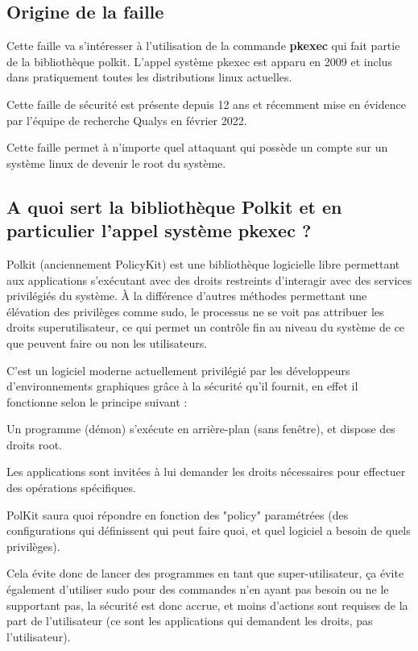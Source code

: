 \documentclass[12pt,a4paper]{article}
\begin{document}
		\subsection{Origine de la faille}   
   		\begin{flushleft}
   			\noindent Cette faille va s'intéresser à l'utilisation de la commande \textbf{pkexec} qui fait partie de la bibliothèque polkit. L'appel système pkexec est apparu en 2009 et inclus dans pratiquement toutes les distributions linux actuelles.
   			\item Cette faille de sécurité est présente depuis 12 ans et récemment mise en évidence par l'équipe de recherche Qualys en février 2022. \cite{qualys}
   			\item Cette faille permet à n’importe quel attaquant qui possède un compte sur un système linux de devenir le root du système.
            \subsection{A quoi sert la bibliothèque Polkit et en particulier l'appel système pkexec ? }
            \begin{flushleft}
                \noindent Polkit (anciennement PolicyKit) est une bibliothèque logicielle libre permettant aux applications s'exécutant avec des droits restreints d'interagir avec des services privilégiés du système. À la différence d'autres méthodes permettant une élévation des privilèges comme sudo, le processus ne se voit pas attribuer les droits superutilisateur, ce qui permet un contrôle fin au niveau du système de ce que peuvent faire ou non les utilisateurs. \cite{policyki47:online}
                \item C'est un logiciel moderne actuellement privilégié par les développeurs d'environnements graphiques grâce à la sécurité qu'il fournit, en effet il fonctionne selon le principe suivant : 
                \item Un programme (démon) s'exécute en arrière-plan (sans fenêtre), et dispose des droits root.
                \item Les applications sont invitées à lui demander les droits nécessaires pour effectuer des opérations spécifiques.
                \item PolKit saura quoi répondre en fonction des "policy" paramétrées (des configurations qui définissent qui peut faire quoi, et quel logiciel a besoin de quels privilèges).
                \item Cela évite donc de lancer des programmes en tant que super-utilisateur, ça évite également d'utiliser sudo pour des commandes n'en ayant pas besoin ou ne le supportant pas, la sécurité est donc accrue, et moins d'actions sont requises de la part de l'utilisateur (ce sont les applications qui demandent les droits, pas l'utilisateur).


\end{flushleft}
\end{flushleft}
\end{document}
